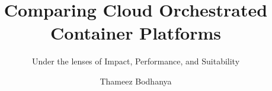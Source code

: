 \documentclass[aspectratio=169,10pt]{uu-beamer}
\title{Comparing Cloud Orchestrated Container Platforms}
\subtitle{Under the lenses of Impact, Performance, and Suitability}
\author[TA. Bodhanya]{Thameez Bodhanya}
\institute[UU]{Uppsala Universitet}
\begin{document}
\logopage

\titlepage







\end{document}
